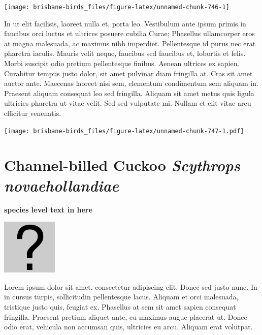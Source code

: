 \documentclass[]{book}
\let\origfigure\figure
\let\endorigfigure\endfigure
\renewenvironment{figure}[1][2] {
  \expandafter\origfigure\expandafter[H]
} {
  \endorigfigure
}
\begin{document}
\begin{figure}
\texttt{[image: brisbane-birds\_files/figure-latex/unnamed-chunk-746-1]} \caption{insert figure caption}\label{fig:unnamed-chunk-746}
\end{figure}

In ut elit facilisis, laoreet nulla et, porta leo. Vestibulum ante ipsum
primis in faucibus orci luctus et ultrices posuere cubilia Curae;
Phasellus ullamcorper eros at magna malesuada, ac maximus nibh
imperdiet. Pellentesque id purus nec erat pharetra iaculis. Mauris velit
neque, faucibus sed faucibus et, lobortis et felis. Morbi suscipit odio
pretium pellentesque finibus. Aenean ultrices ex sapien. Curabitur
tempus justo dolor, sit amet pulvinar diam fringilla at. Cras sit amet
auctor ante. Maecenas laoreet nisi sem, elementum condimentum sem
aliquam in. Praesent aliquam consequat leo sed fringilla. Aliquam sit
amet metus quis ligula ultricies pharetra ut vitae velit. Sed sed
vulputate mi. Nullam et elit vitae arcu efficitur venenatis.

\begin{figure}
\centering
\texttt{[image: brisbane-birds\_files/figure-latex/unnamed-chunk-747-1.pdf]}
\caption{\label{fig:unnamed-chunk-747}insert figure caption}
\end{figure}

\section{\texorpdfstring{Channel-billed Cuckoo \emph{Scythrops
novaehollandiae}}{Channel-billed Cuckoo Scythrops novaehollandiae}}\label{channel-billed-cuckoo-scythrops-novaehollandiae}

\textbf{species level text in here}

\begin{figure}
\centering
\includegraphics{assets/missing.png}
\caption{No image for species}
\end{figure}

Lorem ipsum dolor sit amet, consectetur adipiscing elit. Donec sed justo
nunc. In in cursus turpis, sollicitudin pellentesque lacus. Aliquam et
orci malesuada, tristique justo quis, feugiat ex. Phasellus at sem sit
amet sapien consequat fringilla. Praesent pretium aliquet ante, eu
maximus augue placerat ut. Donec odio erat, vehicula non accumsan quis,
ultricies eu arcu. Aliquam erat volutpat.
\end{document}

